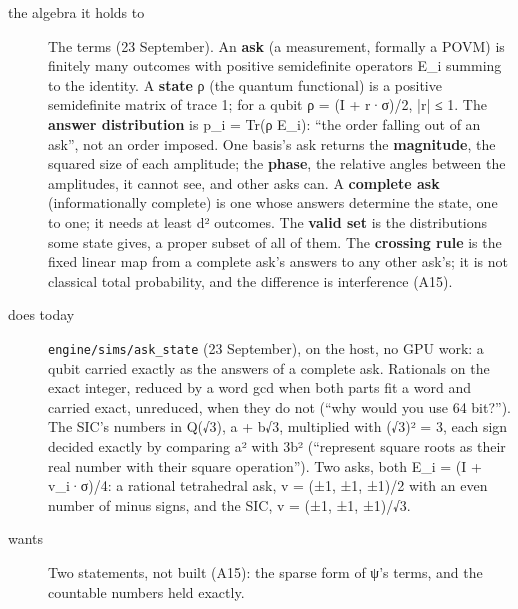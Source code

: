\begin{description}
\item[{the algebra it holds to}] The terms (23 September). An \textbf{ask} (a measurement, formally a POVM) is finitely many outcomes with positive semidefinite operators E\_\allowbreak{}i summing to the identity. A \textbf{state} ρ (the quantum functional) is a positive semidefinite matrix of trace 1; for a qubit ρ = (I + r·σ)/2, |r| ≤ 1. The \textbf{answer distribution} is p\_\allowbreak{}i = Tr(ρ E\_\allowbreak{}i): “the order falling out of an ask”, not an order imposed. One basis's ask returns the \textbf{magnitude}, the squared size of each amplitude; the \textbf{phase}, the relative angles between the amplitudes, it cannot see, and other asks can. A \textbf{complete ask} (informationally complete) is one whose answers determine the state, one to one; it needs at least d² outcomes. The \textbf{valid set} is the distributions some state gives, a proper subset of all of them. The \textbf{crossing rule} is the fixed linear map from a complete ask's answers to any other ask's; it is not classical total probability, and the difference is interference (A15).
\item[{does today}] \texttt{engine/\allowbreak{}sims/\allowbreak{}ask\_\allowbreak{}state} (23 September), on the host, no GPU work: a qubit carried exactly as the answers of a complete ask. Rationals on the exact integer, reduced by a word gcd when both parts fit a word and carried exact, unreduced, when they do not (“why would you use 64 bit?”). The SIC's numbers in Q(√3), a + b√3, multiplied with (√3)² = 3, each sign decided exactly by comparing a² with 3b² (“represent square roots as their real number with their square operation”). Two asks, both E\_\allowbreak{}i = (I + v\_\allowbreak{}i·σ)/4: a rational tetrahedral ask, v = (±1, ±1, ±1)/2 with an even number of minus signs, and the SIC, v = (±1, ±1, ±1)/√3.
\item[{wants}] Two statements, not built (A15): the sparse form of ψ's terms, and the countable numbers held exactly.

\end{description}

